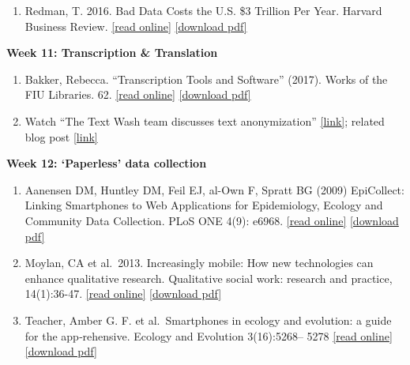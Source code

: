\documentclass[
  12pt,
]{article}
\providecommand{\tightlist}{%
  \setlength{\itemsep}{0pt}\setlength{\parskip}{0pt}}
\begin{document}
\begin{enumerate}
\def\labelenumi{\arabic{enumi}.}
\tightlist
\item
  Redman, T. 2016. Bad Data Costs the U.S. \$3 Trillion Per Year.
  Harvard Business Review.
  \href{https://hbr.org/2016/09/bad-data-costs-the-u-s-3-trillion-per-year\#:~:text=How\%20much\%20is\%20it\%20costing\%20you\%3F\&text=Consider\%20this\%20figure\%3A\%20\%24136\%20billion\%20per\%20year.\&text=But\%20here's\%20another\%20number\%3A\%20\%243.1,the\%20US\%20alone\%2C\%20in\%202016.}{{[}read
  online{]}}
  \href{https://github.com/BrunaLab/LAS6292_DataManagement/blob/master/Assigned_Readings/Redman_2016.pdf}{{[}download
  pdf{]}}
\end{enumerate}

\textbf{Week 11: Transcription \& Translation}

\begin{enumerate}
\def\labelenumi{\arabic{enumi}.}
\item
  Bakker, Rebecca. ``Transcription Tools and Software'' (2017). Works of
  the FIU Libraries. 62.
  \href{https://digitalcommons.fiu.edu/glworks/62}{{[}read online{]}}
  \href{https://github.com/BrunaLab/LAS6292_DataManagement/blob/master/Assigned_Readings/Bakker_transcription_tools_slides.pdf}{{[}download
  pdf{]}}
\item
  Watch ``The Text Wash team discusses text anonymization''
  \href{https://youtu.be/5fFO4ROg4Vw}{{[}link{]}}; related blog post
  \href{https://ocean.sagepub.com/blog/making-sensitive-text-data-accessible-for-computational-social-science}{{[}link{]}}
\end{enumerate}

\textbf{Week 12: `Paperless' data collection}

\begin{enumerate}
\def\labelenumi{\arabic{enumi}.}
\item
  Aanensen DM, Huntley DM, Feil EJ, al-Own F, Spratt BG (2009)
  EpiCollect: Linking Smartphones to Web Applications for Epidemiology,
  Ecology and Community Data Collection. PLoS ONE 4(9): e6968.
  \href{https://journals.plos.org/plosone/article?id=10.1371/journal.pone.0006968}{{[}read
  online{]}}
  \href{https://github.com/BrunaLab/LAS6292_DataManagement/blob/master/Assigned_Readings/Aanensen_etal_2009.PDF}{{[}download
  pdf{]}}
\item
  Moylan, CA et al.~2013. Increasingly mobile: How new technologies can
  enhance qualitative research. Qualitative social work: research and
  practice, 14(1):36-47.
  \href{https://journals.sagepub.com/doi/10.1177/1473325013516988}{{[}read
  online{]}}
  \href{https://github.com/BrunaLab/LAS6292_DataManagement/blob/master/Assigned_Readings/Moylan_etal_2015.pdf}{{[}download
  pdf{]}}
\item
  Teacher, Amber G. F. et al.~Smartphones in ecology and evolution: a
  guide for the app‐rehensive. Ecology and Evolution 3(16):5268-- 5278
  \href{https://onlinelibrary.wiley.com/doi/full/10.1002/ece3.888}{{[}read
  online{]}}
  \href{https://github.com/BrunaLab/LAS6292_DataManagement/blob/master/Assigned_Readings/Teacher_etal_2013.pdf}{{[}download
  pdf{]}}
\end{enumerate}
\end{document}
